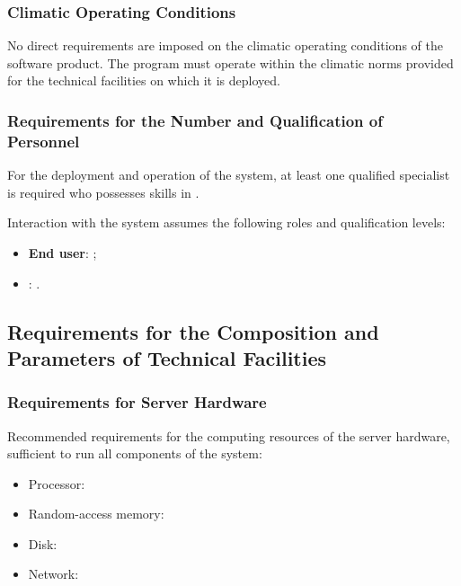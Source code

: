 \documentclass[12pt,a4paper]{extarticle}
\begin{document}
\subsubsection{Climatic Operating Conditions}

No direct requirements are imposed on the climatic operating conditions of the software product. The program must operate within the climatic norms provided for the technical facilities on which it is deployed.

\subsubsection{Requirements for the Number and Qualification of Personnel}

For the deployment and operation of the system, at least one qualified specialist is required who possesses skills in .

Interaction with the system assumes the following roles and qualification levels:
\begin{itemize}[nosep, leftmargin=1.25cm]
    \item \textbf{End user}: ;
    \item \textbf{}: .
\end{itemize}

\subsection{Requirements for the Composition and Parameters of Technical Facilities}

\subsubsection{Requirements for Server Hardware}
\label{sec:server_hardware}

Recommended requirements for the computing resources of the server hardware, sufficient to run all components of the system:

\begin{itemize}[leftmargin=1.25cm]
\item Processor: 
\item Random-access memory: 
\item Disk: 
\item Network: 
\end{itemize}
\end{document}
